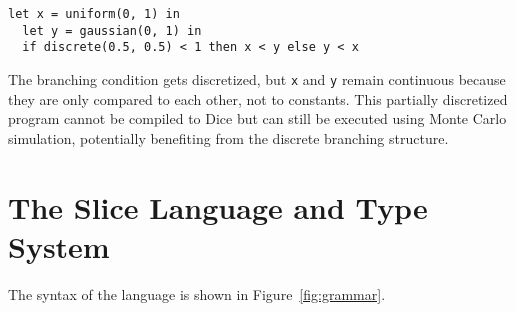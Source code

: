 \documentclass[acmsmall,screen,dvipsnames,x11names,nonacm,anonymous,review]{acmart}
\newcommand{\Slice}{\text{\scshape Slice}\xspace}
\begin{document}
\begin{lstlisting}[aboveskip=1em,belowskip=1em]
  let x = uniform(0, 1) in
  let y = gaussian(0, 1) in
  if discrete(0.5, 0.5) < 1 then x < y else y < x
\end{lstlisting}

\noindent The branching condition gets discretized, but \texttt{x} and \texttt{y} remain continuous because they are only compared to each other, not to constants. This partially discretized program cannot be compiled to Dice but can still be executed using Monte Carlo simulation, potentially benefiting from the discrete branching structure.









\section{The Slice Language and Type System}\label{sec:language}

The syntax of the \Slice language is shown in Figure~\ref{fig:grammar}.
\end{document}

